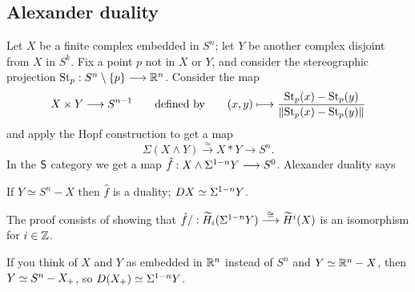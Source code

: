 \subsection*{Alexander duality}
Let $X$ be a finite complex embedded in $S^n$; let $Y$ be another complex disjoint from $X$ in $S^k$. Fix a point $p$ not in $X$ or $Y$, and consider the stereographic projection $\textup{St}_p:S^n\setminus\{p\}\to\R^n$.  Consider the map
\[X \times Y  \to S^{n-1}\text{\qquad defined by\qquad}(x, y)  \mapsto \frac{\textup{St}_p(x)-\textup{St}_p(y)}{\|\textup{St}_p(x)-\textup{St}_p(y)\|}\]
and apply the Hopf construction to get a map
\[\Sigma(X\wedge Y)\overset{\simeq}{\to}X\ast Y\to S^n.\]
In the $\CatOf{S}$ category we get a map $\hat f: X \sprod \Suspend^{1-n} Y \to S^0$.  Alexander duality says
\begin{thm}
If $Y \simeq S^n - X$ then $\hat f$ is a duality; $DX \simeq \Suspend^{1-n} Y$.
\end{thm}
\noindent The proof consists of showing that $\hat f/: \widetilde H_i (\Suspend^{1-n} Y) \stackrel{\cong}{\to} \widetilde H^i (X)$ is an isomorphism for $i \in \Z$.
\begin{rem}
If you think of $X$ and $Y$ as embedded in $\R^n$ instead of $S^n$ and $Y \simeq \R^n - X$, then $Y \simeq S^n - \pt{X}$, so $D(\pt{X}) \simeq \Suspend^{1-n} Y$.
\end{rem}

